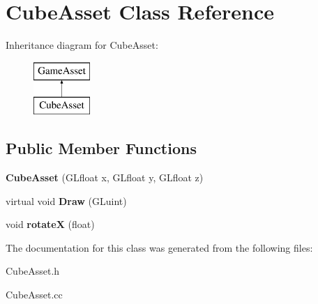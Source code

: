 \hypertarget{classCubeAsset}{}\section{Cube\+Asset Class Reference}
\label{classCubeAsset}
Inheritance diagram for Cube\+Asset\+:\begin{figure}[H]
\begin{center}
\leavevmode
\includegraphics[height=2.000000cm]{classCubeAsset}
\end{center}
\end{figure}
\subsection*{Public Member Functions}
\begin{DoxyCompactItemize}
\item 
\hypertarget{classCubeAsset_a0252e564114a3cda7e3911ef95742a34}{}{\bfseries Cube\+Asset} (G\+Lfloat x, G\+Lfloat y, G\+Lfloat z)\label{classCubeAsset_a0252e564114a3cda7e3911ef95742a34}

\item 
\hypertarget{classCubeAsset_a1af568486056e254ffcf98fd99947bfe}{}virtual void {\bfseries Draw} (G\+Luint)\label{classCubeAsset_a1af568486056e254ffcf98fd99947bfe}

\item 
\hypertarget{classCubeAsset_ad3bd98dd1b0a34b3dc4234913e41c3e5}{}void {\bfseries rotate\+X} (float)\label{classCubeAsset_ad3bd98dd1b0a34b3dc4234913e41c3e5}

\end{DoxyCompactItemize}


The documentation for this class was generated from the following files\+:\begin{DoxyCompactItemize}
\item 
Cube\+Asset.\+h\item 
Cube\+Asset.\+cc\end{DoxyCompactItemize}
